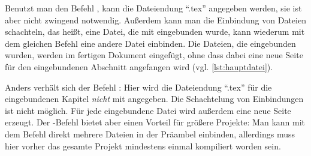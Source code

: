  Benutzt man den Befehl \texttt{}, kann die Dateiendung \enquote{.tex} angegeben werden, sie ist aber nicht zwingend notwendig. Außerdem kann man die Einbindung von Dateien schachteln, das heißt, eine Datei, die mit \texttt{} eingebunden wurde, kann wiederum mit dem gleichen Befehl eine andere Datei einbinden. Die Dateien, die eingebunden wurden, werden im fertigen Dokument eingefügt, ohne dass dabei eine neue Seite für den eingebundenen Abschnitt angefangen wird (vgl. \cref{lst:hauptdatei}).
 
 Anders verhält sich der Befehl \texttt{}: Hier wird die Dateiendung \enquote{.tex} für die eingebundenen Kapitel \emph{nicht} mit angegeben. Die Schachtelung von Einbindungen ist nicht möglich. Für jede eingebundene Datei wird außerdem eine neue Seite erzeugt. Der \texttt{}-Befehl bietet aber einen Vorteil für größere Projekte: Man kann mit dem Befehl \texttt{} direkt mehrere Dateien in der Präambel einbinden, allerdings muss hier vorher das gesamte Projekt mindestens einmal kompiliert worden sein. 
